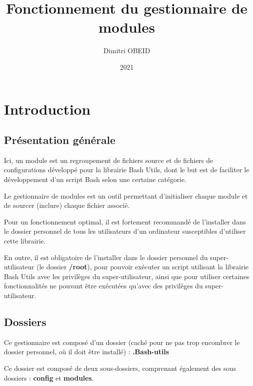 \documentclass[a4paper,10pt]{article}
\title{\color{red}Fonctionnement du gestionnaire de modules}\color{white}
\author{Dimitri OBEID}
\date{2021}
\begin{document}
 \maketitle
 \tableofcontents
 \newpage

 \color{red}
 \section{Introduction}\color{white}

  \color{green}
  \subsection{Présentation générale}\color{white}
  Ici, un module est un regroupement de fichiers source et de fichiers de configurations développé pour la librairie Bash Utils, dont le but est de faciliter le développement d'un script Bash selon une certaine catégorie.\linebreak

  Le gestionnaire de modules est un outil permettant d'initialiser chaque module et de sourcer (inclure) chaque fichier associé.\linebreak

  Pour un fonctionnement optimal, il est fortement recommandé de l'installer dans le dossier personnel de tous les utilisateurs d'un ordinateur susceptibles d'utiliser cette librairie.\linebreak

  En outre, il est obligatoire de l'installer dans le dossier personnel du super-utilisateur (le dossier \textbf{\color{lime}/root\color{white}}), pour pouvoir exécuter un script utilisant la librairie Bash Utils avec les privilèges du super-utilisateur, ainsi que pour utiliser certaines fonctionnalités ne pouvant être exécutées qu'avec des privilèges du super-utilisateur.

  \color{green}
  \subsection{Dossiers}\color{white}
  Ce gestionnaire est composé d'un dossier (caché pour ne pas trop encombrer le dossier personnel, où il doit être installé) : \textbf{\color{lime}.Bash-utils\color{white}}\linebreak
  
  Ce dossier est composé de deux sous-dossiers, comprenant également des sous dossiers : \textbf{\color{lime}config\color{white}} et \textbf{\color{lime}modules\color{white}}.\linebreak
\end{document}
